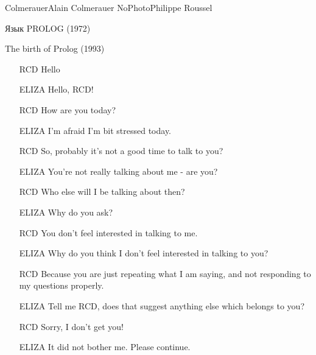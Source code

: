 \documentclass[24pt,pdf,hyperref={unicode}]{beamer}
\begin{document}
\begin{frame}
\doublebio
{Colmerauer}{Alain Colmerauer}
{NoPhoto}{Philippe Roussel}
{Язык PROLOG (1972)

The birth of Prolog (1993)}
\end{frame}


\begin{frame}
\end{frame}

\begin{frame}
\begin{itemize}
 \item[RCD] Hello
\item[ELIZA] Hello, RCD!
\item[RCD] How are you today?
\item[ELIZA] I'm afraid I'm bit stressed today.
\item[RCD] So, probably it's not a good time to talk to you?
\item[ELIZA] You're not really talking about me - are you?
\item[RCD] Who else will I be talking about then?
\item[ELIZA] Why do you ask?
\item[RCD] You don't feel interested in talking to me.
\item[ELIZA] Why do you think I don't feel interested in talking to you?
\item[RCD] Because you are just repeating what I am saying, and not responding to my questions properly.
\item[ELIZA] Tell me RCD, does that suggest anything else which belongs to you?
\item[RCD] Sorry, I don't get you!
\item[ELIZA] It did not bother me. Please continue.
\end{itemize}
\end{frame}
\end{document}
